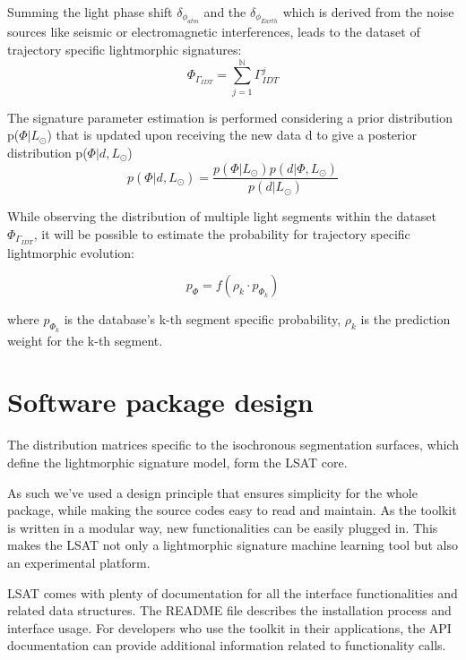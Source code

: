 \documentclass[twoside,11pt]{article}
\begin{document}
Summing the light phase shift $\delta_{\phi_{atm}}$ and the $\delta_{\phi_{Earth}}$ which is derived from the noise sources like seismic or electromagnetic interferences, leads to the dataset of trajectory specific lightmorphic signatures:
\begin{equation}  \label{eq:light intensity trajectories similarities}
\Phi_{\Gamma_{IDT}} = \sum_{j=1}^{\mathbb{N}}{\Gamma_{IDT}^j}
\end{equation}

The signature parameter estimation is performed considering a prior distribution p($\Phi|L_{\odot}$) that is updated upon receiving the new data d to give a posterior distribution p($\Phi|d, L_{\odot}$)
\begin{equation}  \label{distribution}
p(\Phi|d, L_{\odot}) = \frac{p(\Phi|L_{\odot}) p(d|\Phi, L_{\odot})}{p(d|L_{\odot})}
\end{equation}

While observing the distribution of multiple light segments within the dataset $\Phi_{\Gamma_{IDT}}$, it will be possible to estimate the probability for trajectory specific lightmorphic evolution: 

\begin{equation}  \label{eq:light intensity trajectories probability}
p_{\Phi} =  f({\rho_{k} \cdot p_{\Phi_{k}}})
\end{equation}

where $p_{\Phi_{k}}$ is the database's k-th segment specific probability, $\rho_{k}$ is the prediction weight for the k-th segment. 
\section{Software package design}
The distribution matrices specific to the isochronous segmentation surfaces, which define the lightmorphic signature model, form the LSAT core. 

As such we've used a design principle that ensures simplicity for the whole package, while making the source codes easy to read and maintain. As the toolkit is written in a modular way, new functionalities can be easily plugged in. This makes the LSAT not only a lightmorphic signature machine learning tool but also an experimental platform.

LSAT comes with plenty of documentation for all the interface functionalities and related data structures. The README file describes the installation process and interface usage. For developers who use the toolkit in their applications, the API documentation can provide additional information related to functionality calls. 
\end{document}
